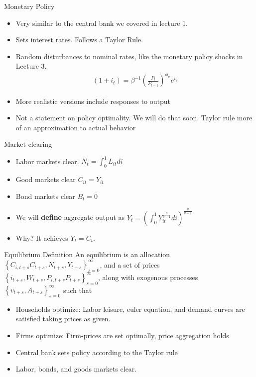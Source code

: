 \documentclass[11pt,aspectratio=169,xcolor={dvipsnames},hyperref={pdftex,pdfpagemode=UseNone,hidelinks,pdfdisplaydoctitle=true},usepdftitle=false]{beamer}
\begin{document}
\begin{frame}{Monetary Policy}
\begin{itemize}
\item Very similar to the central bank we covered in lecture 1.
\pause
\item Sets interest rates. Follows a Taylor Rule.
\pause
\item  Random disturbances to nominal rates, like the monetary policy shocks in Lecture 3.
\begin{align*}
(1+i_t) = \beta^{-1} \left(\frac{P_t}{P_{t-1}}\right)^{\phi_{\pi}} e^{v_t}
\end{align*}
\pause
\item More realistic versions include responses to output
\pause
\item Not a statement on policy optimality. We will do that soon. Taylor rule more of an approximation to actual behavior
\end{itemize}
\end{frame}

\begin{frame}{Market clearing}
\begin{itemize}
\item Labor markets clear. $N_t = \int_0^1 L_{it} di$
\pause
\item Good markets clear $C_{it} = Y_{it}$
\pause
\item Bond markets clear $B_t = 0$
\pause
\item We will \textbf{define} aggregate output as $Y_t = \left(\int_0^1 Y^{\frac{\theta}{\theta-1}}_{it} di \right)^{\frac{\theta}{\theta-1}}$
\item Why? It achieves $Y_t = C_t$.
\end{itemize}
\end{frame}

\begin{frame}{Equilibrium Definition}
An equilibrium is an allocation $\left\lbrace C_{i,t+s} C_{t+s}, N_{t+s},Y_{t+s}\right\rbrace_{s=0}^{\infty}$, and a set of prices $\left\lbrace i_{t+s}, W_{t+s},P_{i,t+s} P_{t+s} \right\rbrace_{s=0}^{\infty}$, along with exogenous processes $\left\lbrace v_{t+s},  A_{t+s} \right\rbrace_{s=0}^{\infty}$ such that
\begin{itemize}
\item Households optimize: Labor leisure, euler equation, and demand curves are satisfied taking prices as given.
\item Firms optimize: Firm-prices are set optimally, price aggregation holds
\item Central bank sets policy according to the Taylor rule
\item Labor, bonds, and goods markets clear.
\end{itemize}
\end{frame}
\end{document}
